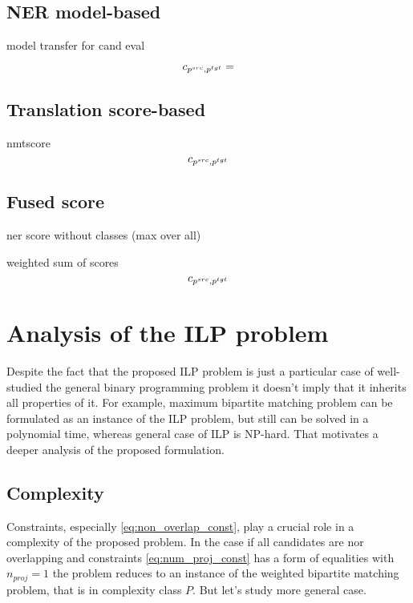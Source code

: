 \subsection{NER model-based}

model transfer for cand eval

\begin{equation} \label{eq:ner_cost}
    c_{p^{src}, p^{tgt}} =
\end{equation}

\subsection{Translation score-based}

nmtscore
\begin{equation} \label{eq:nmt_cost}
    c_{p^{src}, p^{tgt}}
\end{equation}

\subsection{Fused score}

ner score without classes (max over all)

weighted sum of scores
\begin{equation} \label{eq:fused_cost}
    c_{p^{src}, p^{tgt}}
\end{equation}

\section{Analysis of the ILP problem}
Despite the fact that the proposed ILP problem is just a particular case
of well-studied the general binary programming problem it doesn't imply that
it inherits all properties of it. For example, maximum bipartite matching problem
can be formulated as an instance of the ILP problem, but still can be solved in a
polynomial time, whereas general case of ILP is NP-hard. That motivates a deeper analysis
of the proposed formulation.

\subsection{Complexity}
Constraints, especially \eqref{eq:non_overlap_const}, play a crucial role in a complexity
of the proposed problem. In the case if all candidates are nor overlapping and constraints
\eqref{eq:num_proj_const} has a form of equalities with \( n_{proj} = 1 \) the problem reduces to
an instance of the weighted bipartite matching problem, that is in complexity class \( P \). But let's study
more general case.

